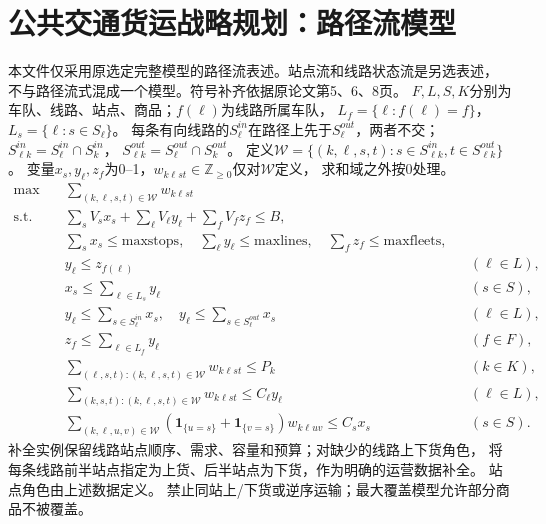 \documentclass[UTF8]{ctexart}
\begin{document}
\section*{公共交通货运战略规划：路径流模型}

本文件仅采用原选定完整模型的路径流表述。站点流和线路状态流是另选表述，
不与路径流式混成一个模型。符号补齐依据原论文第5、6、8页。
$F,L,S,K$分别为车队、线路、站点、商品；$f(\ell)$为线路所属车队，
$L_f=\{\ell:f(\ell)=f\}$，$L_s=\{\ell:s\in S_\ell\}$。
每条有向线路的$S_\ell^{in}$在路径上先于$S_\ell^{out}$，两者不交；
$S_{\ell k}^{in}=S_\ell^{in}\cap S_k^{in}$，
$S_{\ell k}^{out}=S_\ell^{out}\cap S_k^{out}$。
定义$\mathcal W=\{(k,\ell,s,t):s\in S_{\ell k}^{in},t\in S_{\ell k}^{out}\}$。
变量$x_s,y_\ell,z_f$为0--1，$w_{k\ell st}\in\mathbb Z_{\ge0}$仅对$\mathcal W$定义，
求和域之外按0处理。
\begin{align*}
\max\quad &\sum_{(k,\ell,s,t)\in\mathcal W}w_{k\ell st}\\
\text{s.t.}\quad&
\sum_s V_sx_s+\sum_\ell V_\ell y_\ell+\sum_f V_fz_f\le B,\\
&\sum_s x_s\le\mathrm{maxstops},\quad
\sum_\ell y_\ell\le\mathrm{maxlines},\quad\sum_fz_f\le\mathrm{maxfleets},\\
&y_\ell\le z_{f(\ell)}&&(\ell\in L),\\
&x_s\le\sum_{\ell\in L_s}y_\ell&&(s\in S),\\
&y_\ell\le\sum_{s\in S_\ell^{in}}x_s,\quad
y_\ell\le\sum_{s\in S_\ell^{out}}x_s&&(\ell\in L),\\
&z_f\le\sum_{\ell\in L_f}y_\ell&&(f\in F),\\
&\sum_{(\ell,s,t):(k,\ell,s,t)\in\mathcal W}w_{k\ell st}\le P_k&&(k\in K),\\
&\sum_{(k,s,t):(k,\ell,s,t)\in\mathcal W}w_{k\ell st}\le C_\ell y_\ell&&(\ell\in L),\\
&\sum_{(k,\ell,u,v)\in\mathcal W}
(\mathbf1_{\{u=s\}}+\mathbf1_{\{v=s\}})w_{k\ell uv}\le C_sx_s&&(s\in S).
\end{align*}
补全实例保留线路站点顺序、需求、容量和预算；对缺少的线路上下货角色，
将每条线路前半站点指定为上货、后半站点为下货，作为明确的运营数据补全。
站点角色由上述数据定义。
禁止同站上/下货或逆序运输；最大覆盖模型允许部分商品不被覆盖。
\end{document}
